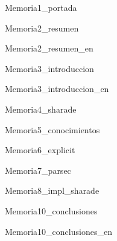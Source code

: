\documentclass[12pt, titlepage]{article}
\begin{document}
{Memoria1_portada}
\tableofcontents
\newpage

{Memoria2_resumen}
\newpage

{Memoria2_resumen_en}
\newpage

{Memoria3_introduccion}
\newpage

{Memoria3_introduccion_en}
\newpage

{Memoria4_sharade}
\newpage

{Memoria5_conocimientos}
\newpage

{Memoria6_explicit}
\newpage

{Memoria7_parsec}
\newpage

{Memoria8_impl_sharade}
\newpage

{Memoria10_conclusiones}
\newpage

{Memoria10_conclusiones_en}
\newpage



\end{document}
